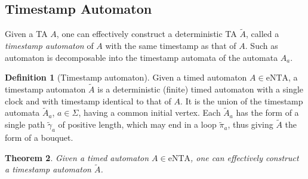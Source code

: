 \documentclass[11pt]{amsart}
\newtheorem{theorem}{Theorem}[section]
\theoremstyle{definition}
\newtheorem{definition}[theorem]{Definition}
\newcommand{\ntaeps}{\mathrm{eNTA}}
\newcommand{\Actions}{\Sigma}
\begin{document}
\subsection{Timestamp Automaton}
Given a TA $A$, one can effectively construct a deterministic TA $\tilde{A}$, called a \emph{timestamp automaton} of $A$ with the same timestamp as that of $A$.
Such as automaton is decomposable into the timestamp automata of the automata $A_a$.
\begin{definition}[Timestamp automaton]
	Given a timed automaton $A \in \ntaeps$, a timestamp automaton $\tilde{A}$ is a deterministic (finite) timed automaton with a single clock and with timestamp identical to that of $A$.
	It is the union of the timestamp automata $\tilde{A}_a$, $a \in \Actions$, having a common initial vertex.
	Each $\tilde{A}_a$ has the form of a single path $\tilde{\gamma}_a$ of positive length, which may end in a loop $\tilde{\pi}_a$, thus giving $\tilde{A}$ the form of a bouquet.
\end{definition}
\begin{theorem}
	\label{th:timestamp_contruct}
	Given a timed automaton $A \in \ntaeps$, one can effectively construct a timestamp automaton $\tilde{A}$.
\end{theorem}
\end{document}
